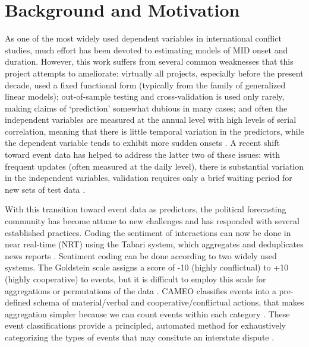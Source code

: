 \documentclass[12pt,letterpaper]{article}
\begin{document}



\section{Background and Motivation} %
\label{lit}

As one of the most widely used dependent variables in international conflict studies, much effort has been devoted to estimating models of MID onset and duration. However, this work suffers from several common weaknesses that this project attempts to ameliorate: virtually all projects, especially before the present decade, used a fixed functional form (typically from the family of generalized linear models); out-of-sample testing and cross-validation is used only rarely, making claims of `prediction' somewhat dubious in many cases; and often the independent variables are measured at the annual level with high levels of serial correlation, meaning that there is little temporal variation in the predictors, while the dependent variable tends to exhibit more sudden onsets \citep{ward2010perils}. A recent shift toward event data has helped to address the latter two of these issues: with frequent updates (often measured at the daily level), there is substantial variation in the independent variables, validation requires only a brief waiting period for new sets of test data \citep{gerner1994,gerner:etal:2002,king2003automated,ruggeri2011events,schrodt2013gdelt}. 

With this transition toward event data as predictors, the political forecasting community has become attune to new challenges and has responded with several established practices. Coding the sentiment of interactions can now be done in near real-time (NRT) using the Tabari system, which aggregates and deduplicates news reports \citep{o2010crisis,schrodt2009tabari}. Sentiment coding can be done according to two widely used systems. The Goldstein scale assigns a score of -10 (highly conflictual) to +10 (highly cooperative) to events, but it is difficult to employ this scale for aggregations or permutations of the data \citep{goldstein1992conflict}. CAMEO classifies events into a pre-defined schema of material/verbal and cooperative/conflictual actions, that makes aggregation simpler because we can count events within each category \citep{gerner:etal:2002}. These event classifications provide a principled, automated method for exhaustively categorizing  the types of events that may consitute an interstate dispute \citep{ghosn2004mid3}.
\end{document}
